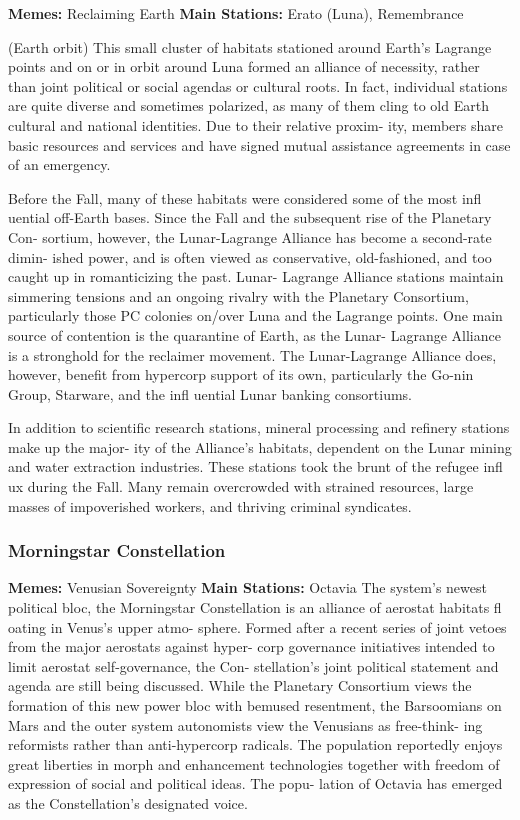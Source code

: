 \textbf{Memes: }Reclaiming Earth
\textbf{Main Stations:} Erato (Luna), Remembrance 

(Earth orbit)
This small cluster of habitats stationed around Earth's 
Lagrange points and on or in orbit around Luna 
formed an alliance of necessity, rather than joint 
political or social agendas or cultural roots. In fact, 
individual stations are quite diverse and sometimes 
polarized, as many of them cling to old Earth cultural 
and national identities. Due to their relative proxim-
ity, members share basic resources and services and 
have signed mutual assistance agreements in case of 
an emergency.

Before the Fall, many of these habitats were 
considered some of the most 
infl uential off-Earth bases. 
Since the Fall and the 
subsequent rise of 
the Planetary Con-
sortium, however, 
the Lunar-Lagrange 
Alliance has become 
a second-rate dimin-
ished power, and is 
often viewed as conservative, old-fashioned, and 
too caught up in romanticizing the past. Lunar-
Lagrange Alliance stations maintain simmering 
tensions and an ongoing rivalry with the Planetary 
Consortium, particularly those PC colonies on/over 
Luna and the Lagrange points. One main source of 
contention is the quarantine of Earth, as the Lunar-
Lagrange Alliance is a stronghold for the reclaimer 
movement. The Lunar-Lagrange Alliance does, 
however, benefit from hypercorp support of its own, 
particularly the Go-nin Group, Starware, and the 
infl uential Lunar banking consortiums.

In addition to scientific research stations, mineral 
processing and refinery stations make up the major-
ity of the Alliance's habitats, dependent on the Lunar 
mining and water extraction industries. These stations 
took the brunt of the refugee infl ux during the Fall. 
Many remain overcrowded with strained resources, 
large masses of impoverished workers, and thriving 
criminal syndicates.

\subsubsection{Morningstar Constellation}

\textbf{Memes:} Venusian Sovereignty
\textbf{Main Stations:} Octavia
The system's newest political bloc, the Morningstar 
Constellation is an alliance of aerostat 
habitats fl oating in Venus's upper atmo-
sphere. Formed after a recent 
series of joint vetoes from the 
major aerostats against hyper-
corp governance initiatives 
intended to limit aerostat 
self-governance, the Con-
stellation's joint political 
statement and agenda are still 
being discussed. While the 
Planetary Consortium views 
the formation of this new power bloc with bemused 
resentment, the Barsoomians on Mars and the outer 
system autonomists view the Venusians as free-think-
ing reformists rather than anti-hypercorp radicals. The 
population reportedly enjoys great liberties in morph 
and enhancement technologies together with freedom 
of expression of social and political ideas. The popu-
lation of Octavia has emerged as the Constellation's 
designated voice.

